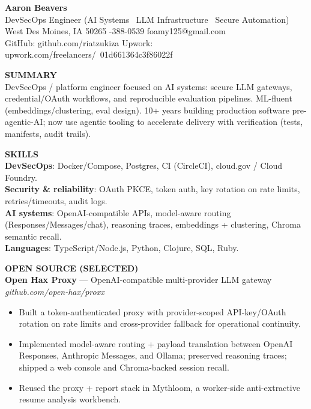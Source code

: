 \documentclass[10pt]{article}
\begin{document}
{\LARGE \textbf{Aaron Beavers}}\\
DevSecOps Engineer (AI Systems \textbullet\ LLM Infrastructure \textbullet\ Secure Automation)\\

West Des Moines, IA 50265 \;\;\textbar\;-388-0539 \;\;\textbar\;\; foamy125@gmail.com\\
GitHub: github.com/riatzukiza \;\;\textbar\;\; Upwork: upwork.com/freelancers/~01d661364c3f86022f

\vspace{4pt}
\textbf{SUMMARY}\\
DevSecOps / platform engineer focused on AI systems: secure LLM gateways, credential/OAuth workflows, and reproducible evaluation pipelines. ML-fluent (embeddings/clustering, eval design). 10+ years building production software pre-agentic-AI; now use agentic tooling to accelerate delivery with verification (tests, manifests, audit trails).

\vspace{2pt}
\textbf{SKILLS}\\
\textbf{DevSecOps}: Docker/Compose, Postgres, CI (CircleCI), cloud.gov / Cloud Foundry.\\
\textbf{Security \& reliability}: OAuth PKCE, token auth, key rotation on rate limits, retries/timeouts, audit logs.\\
\textbf{AI systems}: OpenAI-compatible APIs, model-aware routing (Responses/Messages/chat), reasoning traces, embeddings + clustering, Chroma semantic recall.\\
\textbf{Languages}: TypeScript/Node.js, Python, Clojure, SQL, Ruby.

\vspace{4pt}
\textbf{OPEN SOURCE (SELECTED)}\\

\textbf{Open Hax Proxy} --- OpenAI-compatible multi-provider LLM gateway \hfill \textit{github.com/open-hax/proxx}\\
\vspace{-6pt}
\begin{itemize}
  \setlength\itemsep{-2pt}
  \setlength\parskip{0pt}
  \setlength\parsep{0pt}
  \item Built a token-authenticated proxy with provider-scoped API-key/OAuth rotation on rate limits and cross-provider fallback for operational continuity.
  \item Implemented model-aware routing + payload translation between OpenAI Responses, Anthropic Messages, and Ollama; preserved reasoning traces; shipped a web console and Chroma-backed session recall.
  \item Reused the proxy + report stack in Mythloom, a worker-side anti-extractive resume analysis workbench.
\end{itemize}
\end{document}
